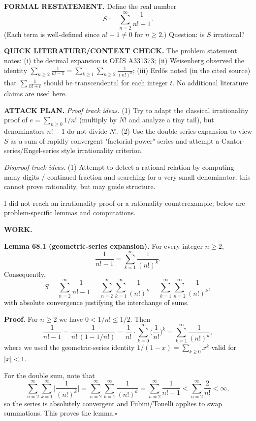 
\noindent\textbf{FORMAL RESTATEMENT.}
Define the real number
\[
S:=\sum_{n=2}^{\infty}\frac{1}{n!-1}.
\]
(Each term is well-defined since $n!-1\neq 0$ for $n\ge 2$.)
Question: is $S$ irrational?

\medskip
\noindent\textbf{QUICK LITERATURE/CONTEXT CHECK.}
The problem statement notes:
(i) the decimal expansion is OEIS A331373;
(ii) Weisenberg observed the identity $\sum_{n\ge2}\frac{1}{n!-1}=\sum_{k\ge1}\sum_{n\ge2}\frac{1}{(n!)^k}$;
(iii) Erd\H{o}s noted (in the cited source) that $\sum \frac{1}{n!+t}$ should be transcendental for each integer $t$.
No additional literature claims are used here.

\medskip
\noindent\textbf{ATTACK PLAN.}
\emph{Proof track ideas.}
(1) Try to adapt the classical irrationality proof of $e=\sum_{n\ge0}1/n!$ (multiply by $N!$ and analyze a tiny tail), but denominators $n!-1$ do not divide $N!$.
(2) Use the double-series expansion to view $S$ as a sum of rapidly convergent "factorial-power" series and attempt a Cantor-series/Engel-series style irrationality criterion.

\emph{Disproof track ideas.}
(1) Attempt to detect a rational relation by computing many digits / continued fraction and searching for a very small denominator; this cannot prove rationality, but may guide structure.

I did not reach an irrationality proof or a rationality counterexample; below are problem-specific lemmas and computations.

\medskip
\noindent\textbf{WORK.}

\medskip
\noindent\textbf{Lemma 68.1 (geometric-series expansion).}
For every integer $n\ge 2$,
\[
\frac{1}{n!-1}=\sum_{k=1}^{\infty}\frac{1}{(n!)^k}.
\]
Consequently,
\[
S=\sum_{n=2}^{\infty}\frac{1}{n!-1}=\sum_{n=2}^{\infty}\sum_{k=1}^{\infty}\frac{1}{(n!)^k}=\sum_{k=1}^{\infty}\sum_{n=2}^{\infty}\frac{1}{(n!)^k},
\]
with absolute convergence justifying the interchange of sums.

\noindent\textbf{Proof.}
For $n\ge 2$ we have $0<1/n!\le 1/2$. Then
\[
\frac{1}{n!-1}=\frac{1}{n!\,(1-1/n!)}=\frac{1}{n!}\cdot\sum_{k=0}^{\infty}\Big(\frac{1}{n!}\Big)^k
=\sum_{k=1}^{\infty}\frac{1}{(n!)^k},
\]
where we used the geometric-series identity $1/(1-x)=\sum_{k\ge0}x^k$ valid for $\lvert x\rvert<1$.

For the double sum, note that
\[
\sum_{n=2}^{\infty}\sum_{k=1}^{\infty}\Big\lvert\frac{1}{(n!)^k}\Big\rvert
=\sum_{n=2}^{\infty}\sum_{k=1}^{\infty}\frac{1}{(n!)^k}
=\sum_{n=2}^{\infty}\frac{1}{n!-1}
<\sum_{n=2}^{\infty}\frac{2}{n!}<\infty,
\]
so the series is absolutely convergent and Fubini/Tonelli applies to swap summations.
This proves the lemma.\hfill$\square$


